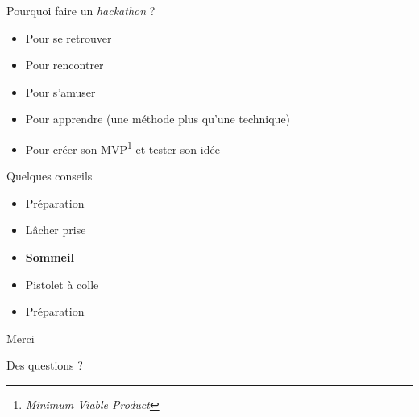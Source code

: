 \documentclass[14pt]{beamer}
\begin{document}
\begin{frame}{Pourquoi faire un {\sl hackathon} ?}
	\begin{itemize}
		\item Pour se retrouver
		\pause\item Pour rencontrer 
		\pause\item Pour s'amuser
		\pause\item Pour apprendre (une méthode plus qu'une technique)
		\pause\item Pour créer son MVP\footnote<5->{\sl Minimum Viable Product} et tester son idée
	\end{itemize}
\end{frame}

\begin{frame}{Quelques conseils}
	\begin{itemize}
		\item Préparation
		\pause\item Lâcher prise
		\pause\item {\bf Sommeil}
		\pause\item Pistolet à colle
		\pause\item Préparation
	\end{itemize}
\end{frame}

\begin{frame}{Merci}
	\begin{exampleblock}{Des questions ?}
	\end{exampleblock}
\end{frame}
\end{document}
